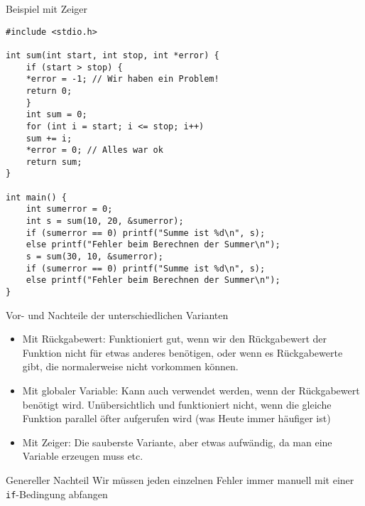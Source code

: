 \documentclass[presentation]{beamer}
\begin{document}
\begin{frame}[label={sec:org8381168},fragile]{Beispiel mit Zeiger}
 \begin{verbatim}
#include <stdio.h>

int sum(int start, int stop, int *error) {
    if (start > stop) {
	*error = -1; // Wir haben ein Problem!
	return 0;
    }
    int sum = 0;
    for (int i = start; i <= stop; i++)
	sum += i;
    *error = 0; // Alles war ok
    return sum;
}

int main() {
    int sumerror = 0;
    int s = sum(10, 20, &sumerror);
    if (sumerror == 0) printf("Summe ist %d\n", s);
    else printf("Fehler beim Berechnen der Summer\n");
    s = sum(30, 10, &sumerror);
    if (sumerror == 0) printf("Summe ist %d\n", s);
    else printf("Fehler beim Berechnen der Summer\n");
}
\end{verbatim}
\end{frame}
\begin{frame}[label={sec:orgbd6f702},fragile]{Vor- und Nachteile der unterschiedlichen Varianten}
 \begin{itemize}
\item \alert{Mit Rückgabewert:} Funktioniert gut, wenn wir den Rückgabewert der
Funktion nicht für etwas anderes benötigen, oder wenn es
Rückgabewerte gibt, die normalerweise nicht vorkommen können.
\item \alert{Mit globaler Variable:} Kann auch verwendet werden, wenn der
Rückgabewert benötigt wird. Unübersichtlich und funktioniert nicht,
wenn die gleiche Funktion parallel öfter aufgerufen wird (was Heute
immer häufiger ist)
\item \alert{Mit Zeiger:} Die sauberste Variante, aber etwas aufwändig, da man
eine Variable erzeugen muss etc.
\end{itemize}
\begin{block}{Genereller Nachteil}
Wir müssen jeden einzelnen Fehler immer manuell mit einer
{\color{solarizedYellow}\verb!if!}-Bedingung abfangen
\end{block}
\end{frame}
\end{document}
